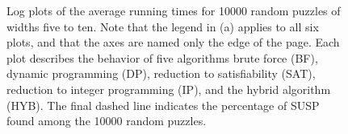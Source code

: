 \begin{figure}
  \vspace{-2ex}
  \caption{Log plots of the average running times for 10000 random puzzles of widths
    five to ten. Note that the legend in (a) applies to all six plots,
    and that the axes are named only the edge of the page.  Each plot
    describes the behavior of five algorithms brute force (BF),
    dynamic programming (DP), reduction to satisfiability (SAT),
    reduction to integer programming (IP), and the hybrid algorithm
    (HYB).  The final dashed line indicates the percentage of SUSP
    found among the 10000 random puzzles.}
  \label{fig:perform}
\end{figure}
  
